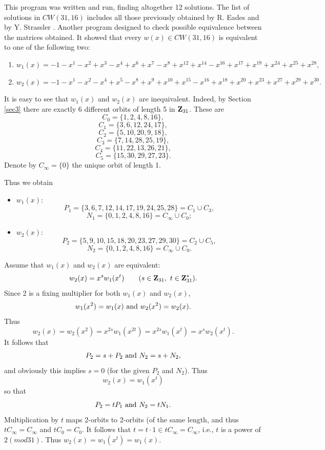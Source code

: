 {{{\begin{enumerate}
	 This program was written and run, finding altogether 12 solutions. 
	The list of solutions in $CW(31,16)$ includes all those  
	previously obtained by R. Eades \cite{ead80} and by Y. Strassler 
	\cite{str95}. Another program designed to check possible equivalence 
	between the matrices obtained. It showed that every $w(x) \in CW(31,16)$ 
	is equivalent to one of the following two: 
	 \begin{enumerate}
	      \item $w_{1}(x)=-1-x^{1}-x^{2}+x^{3}-x^{4}+x^{6}+x^{7}-x^{8}+x^{12}+x^{14}-x^{16}+x^{17}+x^{19}+x^{24}+x^{25}+x^{28}, $
	      \item $w_{2}(x)=-1-x^{1}-x^{2}-x^{4}+x^{5}-x^{8}+x^{9}+x^{10}+x^{15}-x^{16}+x^{18}+x^{20}+x^{23}+x^{27}+x^{29}+x^{30}. $
	 \end{enumerate}
	 
	It is easy to see that $w_{1}(x)$ and $w_{2}(x)$ are inequivalent. 
	Indeed, by Section \ref{sec3} there are exactly 6 different orbits of 
	length 5 in $ {\bf Z}_{31} $. These are 
	$$C_0=\{1,2,4,8,16\},$$ 
	$$C_1=\{3,6,12,24,17\},$$
	$$C_2=\{5,10,20,9,18\},$$
	$$C_3=\{7,14,28,25,19\},$$
	$$C_4=\{11,22,13,26,21\},$$
	$$C_5=\{15,30,29,27,23\}.$$
	Denote by $C_{\infty}=\{0\}$ the unique orbit of length 1.

	Thus we obtain
\begin{itemize}
 \item $w_{1}(x)$:
  $$ P_1=\{ 3,6,7,12,14,17,19,24,25,28\}= C_1 \cup C_3,$$
  $$ N_1=\{ 0,1,2,4,8,16\}=C_{\infty} \cup C_0;$$

 \item $w_{2}(x)$:
  $$ P_2=\{5,9,10,15,18,20,23,27,29,30\}= C_2 \cup C_5,$$
  $$ N_2=\{ 0,1,2,4,8,16\}=C_{\infty} \cup C_0.$$
\end{itemize}    
			 
	 Assume that $w_{1}(x)$ and $w_{2}(x)$ are equivalent:  
	 $$ w_2(x)=x^{s}w_1(x^t)  \qquad (s \in {\bf Z}_{31}, \ t \in {\bf Z}^{*}_{31}).$$ 
	 Since 2 is a fixing multiplier for both $w_1(x)$ and $w_2(x)$, 
		$$ w_1(x^2)=w_1(x) \ {\rm and } \ w_2(x^2)=w_2(x).$$ 
	 Thus
	   $$w_2(x)=w_2(x^2)=x^{2s}w_1(x^{2t})=x^{2s}w_1(x^t)=x^{s}w_2(x^t).$$ 
	 It follows that 
		$$ P_2=s+P_2 \ {\rm and } \ N_2=s+N_2,$$
	 and obviously this implies $s=0$ (for the given $P_2$ and $N_2$). 
	 Thus  
		$$ w_2(x)=w_1(x^t)$$                 
	 so that 
		$$ P_2=tP_1 \ {\rm and } \ N_2=tN_1.$$
	 Multiplication by $t$ maps 2-orbits to 2-orbits (of the same length, 
	 and thus $tC_{\infty}=C_{\infty}$ and $tC_0=C_0$. It follows that 
	 $t=t \cdot 1 \in tC_{\infty}=C_{\infty}$, i.e., $t$ is a power of 
	 $2 (mod 31)$. Thus $w_2(x)=w_1(x^t)=w_1(x)$. 


\end{enumerate}}}}
